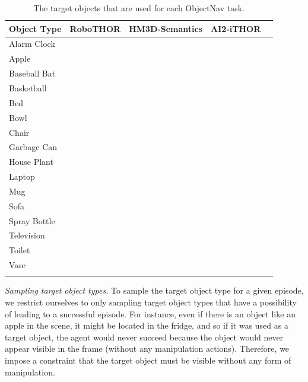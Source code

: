 \begin{table}[htbp]
    \centering
    \begin{tabular}{lcccc}
        \toprule
        Object Type & RoboTHOR & HM3D-Semantics & AI2-iTHOR & \elienv{}\\
        \midrule
        Alarm Clock & \y & \n &\y &\y \\[0.035in]
        Apple & \y & \n & \y & \y\\[0.035in]
        Baseball Bat & \y & \n & \y& \y \\[0.035in]
        Basketball & \y & \n & \y& \y \\[0.035in]
        Bed & \n & \y & \y& \y \\[0.035in]
        Bowl & \y & \n & \y& \y \\[0.035in]
        Chair & \n & \y & \y& \y \\[0.035in]
        Garbage Can & \y & \n & \y& \y \\[0.035in]
        House Plant & \y & \y & \y& \y \\[0.035in]
        Laptop & \y & \n & \y& \y \\[0.035in]
        Mug & \y & \n & \y& \y \\[0.035in]
        Sofa & \n & \y & \y& \y \\[0.035in]
        Spray Bottle & \y & \n & \y& \y \\[0.035in]
        Television & \y & \y & \y& \y \\[0.035in]
        Toilet & \n & \y & \y& \y \\[0.035in]
        Vase & \y& \n & \y& \y \\
     \toprule\\[-0.05in]
    \end{tabular}
    \caption{The target objects that are used for each ObjectNav task.}
    \label{tab:targetObjectTypes}
\end{table}

\emph{Sampling target object types.} To sample the target object type for a given episode, we restrict ourselves to only sampling target object types that have a possibility of leading to a successful episode. For instance, even if there is an object like an apple in the scene, it might be located in the fridge, and so if it was used as a target object, the agent would never succeed because the object would never appear visible in the frame (without any manipulation actions). Therefore, we impose a constraint that the target object must be visible without any form of manipulation.

